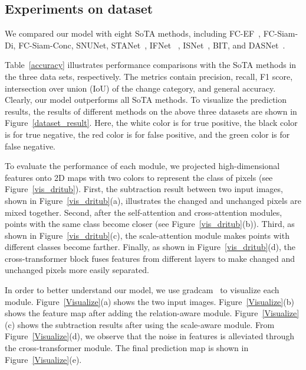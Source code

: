 \documentclass[letterpaper]{article} \usepackage{aaai23}  \usepackage{times}  \usepackage{helvet}  \usepackage{courier}  \usepackage[hyphens]{url}  \usepackage{graphicx} \urlstyle{rm} \def\UrlFont{\rm}  \usepackage{natbib}  \usepackage{caption} \frenchspacing  \setlength{\pdfpagewidth}{8.5in}  \setlength{\pdfpageheight}{11in}  \usepackage{algorithm}
\begin{document}
\subsection{Experiments on dataset}
We compared our model with eight SoTA methods, including FC-EF~\cite{aa8451652}, FC-Siam-Di, FC-Siam-Conc, SNUNet, STANet~\cite{rs12101662}, IFNet~\cite{ZHANG2020183} , ISNet~\cite{9772654}, BIT, and DASNet~\cite{DASNet2021}.



 Table~\ref{accuracy} illustrates performance comparisons with the SoTA methods in the three data sets, respectively. The metrics contain precision, recall, F1 score, intersection over union (IoU) of the change category, and general accuracy.  Clearly, our model outperforms all SoTA methods. To visualize the prediction results, the results of different methods on the above three datasets are shown in Figure~\ref{dataset_result}. Here, the white color is for true positive, the black color is for true negative, the red color is for false positive, and the green color is for false negative. 
 
 To evaluate the performance of each module, we projected high-dimensional features onto 2D maps with two colors to represent the class of pixels (see Figure~\ref{vis_dritub}). First, the subtraction result between two input images, shown in Figure~\ref{vis_dritub}(a), illustrates the changed and unchanged pixels are mixed together. Second, after the self-attention and cross-attention modules, points with the same class become closer (see Figure~\ref{vis_dritub}(b)). Third,
as shown in Figure~\ref{vis_dritub}(c), the scale-attention module makes points with different classes become farther. Finally, as shown in Figure~\ref{vis_dritub}(d), the
cross-transformer block fuses features from different layers to make changed and unchanged pixels more easily separated. 


 




In order to better understand our model, we use gradcam~\cite{jacobgilpytorchcam} to visualize each module. Figure~\ref{Visualize}(a) shows the two input images. Figure~\ref{Visualize}(b) shows the feature map after adding the relation-aware module. Figure~\ref{Visualize}(c) shows the subtraction results after using the scale-aware module. From Figure~\ref{Visualize}(d), we observe that the noise in features is alleviated through the cross-transformer module. The final prediction map is shown in Figure~\ref{Visualize}(e).
\end{document}
